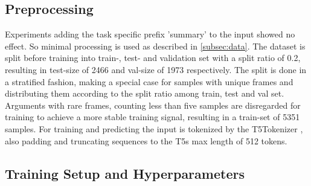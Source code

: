 \documentclass[11pt,a4paper,onecolumn,oneside,notitlepage]{article}
\begin{document}
\subsection{Preprocessing}
Experiments adding the task specific prefix 'summary' \citep{T5} to the input showed no effect. So minimal processing is used as described in  \ref{subsec:data}. The dataset is split before training into train-, test- and validation set with a split ratio of \num{0.2}, resulting in test-size of \num{2466} and val-size of \num{1973} respectively. The split is done in a stratified fashion, making a special case for samples with unique frames and distributing them according to the split ratio among train, test and val set. Arguments with rare frames, counting less than five samples are disregarded for training to achieve a more stable training signal, resulting in a train-set of \num{5351} samples. For training and predicting the input is tokenized by the T5Tokenizer \citep{wolf-etal-2020-transformers}, also padding and truncating sequences to the T5s max length of \num{512} tokens. 

\subsection{Training Setup and Hyperparameters}
\end{document}
